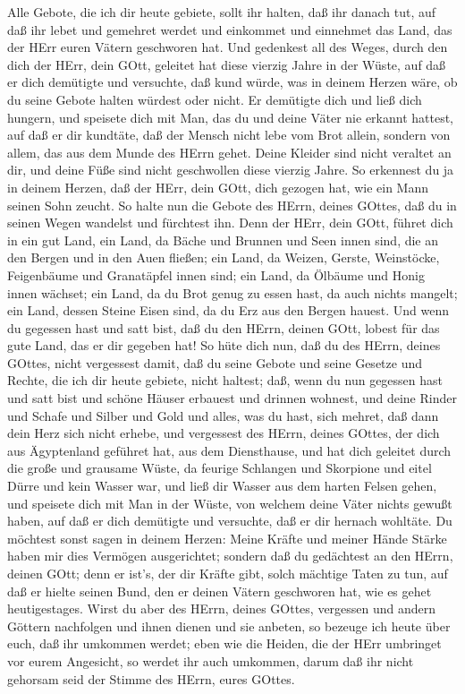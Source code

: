  Alle Gebote, die ich dir heute gebiete, sollt ihr halten,
daß ihr danach tut, auf daß ihr lebet und gemehret werdet und einkommet
und einnehmet das Land, das der HErr euren Vätern geschworen hat.
 Und gedenkest all des Weges, durch den dich der HErr, dein
GOtt, geleitet hat diese vierzig Jahre in der Wüste, auf daß er dich
demütigte und versuchte, daß kund würde, was in deinem Herzen wäre, ob
du seine Gebote halten würdest oder nicht.  Er demütigte
dich und ließ dich hungern, und speisete dich mit Man, das du und deine
Väter nie erkannt hattest, auf daß er dir kundtäte, daß der Mensch nicht
lebe vom Brot allein, sondern von allem, das aus dem Munde des HErrn
gehet.  Deine Kleider sind nicht veraltet an dir, und deine
Füße sind nicht geschwollen diese vierzig Jahre.  So
erkennest du ja in deinem Herzen, daß der HErr, dein GOtt, dich gezogen
hat, wie ein Mann seinen Sohn zeucht.  So halte nun die
Gebote des HErrn, deines GOttes, daß du in seinen Wegen wandelst und
fürchtest ihn.  Denn der HErr, dein GOtt, führet dich in ein
gut Land, ein Land, da Bäche und Brunnen und Seen innen sind, die an den
Bergen und in den Auen fließen;  ein Land, da Weizen,
Gerste, Weinstöcke, Feigenbäume und Granatäpfel innen sind; ein Land, da
Ölbäume und Honig innen wächset;  ein Land, da du Brot genug
zu essen hast, da auch nichts mangelt; ein Land, dessen Steine Eisen
sind, da du Erz aus den Bergen hauest.  Und wenn du
gegessen hast und satt bist, daß du den HErrn, deinen GOtt, lobest für
das gute Land, das er dir gegeben hat!  So hüte dich nun,
daß du des HErrn, deines GOttes, nicht vergessest damit, daß du seine
Gebote und seine Gesetze und Rechte, die ich dir heute gebiete, nicht
haltest;  daß, wenn du nun gegessen hast und satt bist und
schöne Häuser erbauest und drinnen wohnest,  und deine
Rinder und Schafe und Silber und Gold und alles, was du hast, sich
mehret,  daß dann dein Herz sich nicht erhebe, und
vergessest des HErrn, deines GOttes, der dich aus Ägyptenland geführet
hat, aus dem Diensthause,  und hat dich geleitet durch die
große und grausame Wüste, da feurige Schlangen und Skorpione und eitel
Dürre und kein Wasser war, und ließ dir Wasser aus dem harten Felsen
gehen,  und speisete dich mit Man in der Wüste, von welchem
deine Väter nichts gewußt haben, auf daß er dich demütigte und
versuchte, daß er dir hernach wohltäte.  Du möchtest sonst
sagen in deinem Herzen: Meine Kräfte und meiner Hände Stärke haben mir
dies Vermögen ausgerichtet;  sondern daß du gedächtest an
den HErrn, deinen GOtt; denn er ist's, der dir Kräfte gibt, solch
mächtige Taten zu tun, auf daß er hielte seinen Bund, den er deinen
Vätern geschworen hat, wie es gehet heutigestages.  Wirst
du aber des HErrn, deines GOttes, vergessen und andern Göttern
nachfolgen und ihnen dienen und sie anbeten, so bezeuge ich heute über
euch, daß ihr umkommen werdet;  eben wie die Heiden, die
der HErr umbringet vor eurem Angesicht, so werdet ihr auch umkommen,
darum daß ihr nicht gehorsam seid der Stimme des HErrn, eures GOttes.

